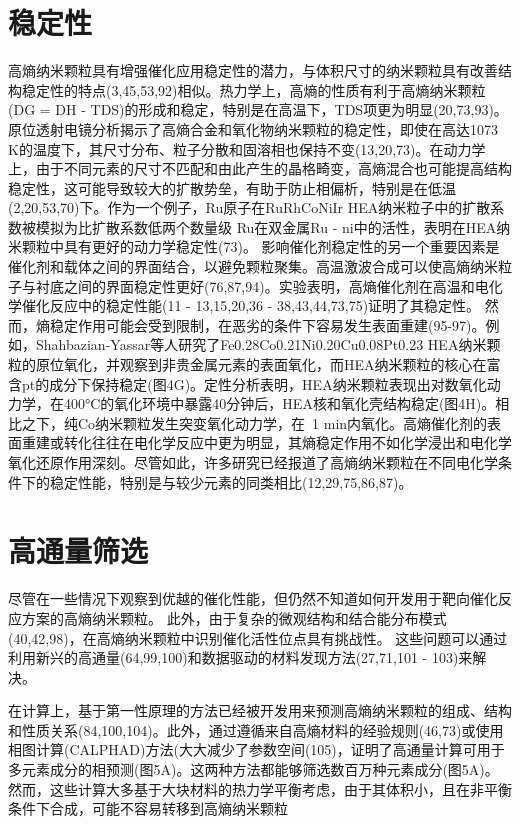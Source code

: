 \documentclass[a4paper]{article}
\begin{document}
\section*{稳定性}

高熵纳米颗粒具有增强催化应用稳定性的潜力，与体积尺寸的纳米颗粒具有改善结构稳定性的特点(3,45,53,92)相似。热力学上，高熵的性质有利于高熵纳米颗粒(DG = DH - TDS)的形成和稳定，特别是在高温下，TDS项更为明显(20,73,93)。原位透射电镜分析揭示了高熵合金和氧化物纳米颗粒的稳定性，即使在高达1073 K的温度下，其尺寸分布、粒子分散和固溶相也保持不变(13,20,73)。在动力学上，由于不同元素的尺寸不匹配和由此产生的晶格畸变，高熵混合也可能提高结构稳定性，这可能导致较大的扩散势垒，有助于防止相偏析，特别是在低温(2,20,53,70)下。作为一个例子，Ru原子在RuRhCoNiIr HEA纳米粒子中的扩散系数被模拟为比扩散系数低两个数量级
Ru在双金属Ru - ni中的活性，表明在HEA纳米颗粒中具有更好的动力学稳定性(73)。
影响催化剂稳定性的另一个重要因素是催化剂和载体之间的界面结合，以避免颗粒聚集。高温激波合成可以使高熵纳米粒子与衬底之间的界面稳定性更好(76,87,94)。实验表明，高熵催化剂在高温和电化学催化反应中的稳定性能(11 - 13,15,20,36 - 38,43,44,73,75)证明了其稳定性。
然而，熵稳定作用可能会受到限制，在恶劣的条件下容易发生表面重建(95-97)。例如，Shahbazian-Yassar等人研究了Fe0.28Co0.21Ni0.20Cu0.08Pt0.23 HEA纳米颗粒的原位氧化，并观察到非贵金属元素的表面氧化，而HEA纳米颗粒的核心在富含pt的成分下保持稳定(图4G)。定性分析表明，HEA纳米颗粒表现出对数氧化动力学，在400°C的氧化环境中暴露40分钟后，HEA核和氧化壳结构稳定(图4H)。相比之下，纯Co纳米颗粒发生突变氧化动力学，在~1 min内氧化。高熵催化剂的表面重建或转化往往在电化学反应中更为明显，其熵稳定作用不如化学浸出和电化学氧化还原作用深刻。尽管如此，许多研究已经报道了高熵纳米颗粒在不同电化学条件下的稳定性能，特别是与较少元素的同类相比(12,29,75,86,87)。


\section*{高通量筛选}
尽管在一些情况下观察到优越的催化性能，但仍然不知道如何开发用于靶向催化反应方案的高熵纳米颗粒。
此外，由于复杂的微观结构和结合能分布模式(40,42,98)，在高熵纳米颗粒中识别催化活性位点具有挑战性。
这些问题可以通过利用新兴的高通量(64,99,100)和数据驱动的材料发现方法(27,71,101 - 103)来解决。



在计算上，基于第一性原理的方法已经被开发用来预测高熵纳米颗粒的组成、结构和性质关系(84,100,104)。此外，通过遵循来自高熵材料的经验规则(46,73)或使用相图计算(CALPHAD)方法(大大减少了参数空间(105)，证明了高通量计算可用于多元素成分的相预测(图5A)。这两种方法都能够筛选数百万种元素成分(图5A)。
然而，这些计算大多基于大块材料的热力学平衡考虑，由于其体积小，且在非平衡条件下合成，可能不容易转移到高熵纳米颗粒
\end{document}
